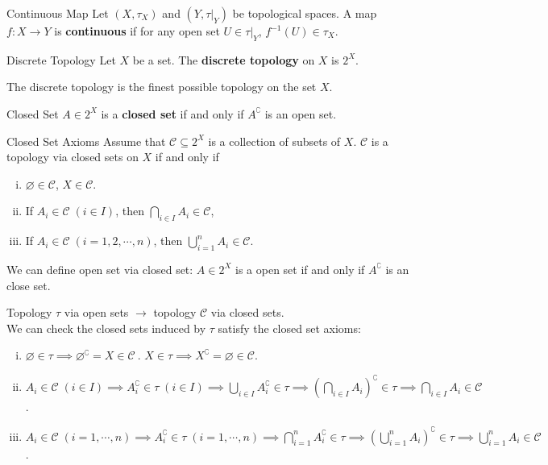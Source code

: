 \documentclass{report}
\begin{document}
\begin{definition}{Continuous Map}{}
	Let $(X,\tau_X)$ and $(Y,\tau |_Y)$ be topological spaces. A map $f:X\to Y$ is \textbf{continuous} if for any open set $U\in\tau |_Y$, $f^{-1}(U)\in\tau_X$.
\end{definition}

\begin{definition}{Discrete Topology}{}
	Let $X$ be a set. The \textbf{discrete topology} on $X$ is $2^X$.
\end{definition}

The discrete topology is the finest possible topology on the set $X$.

\begin{definition}{Closed Set}{}
	$A\in 2^X$ is a \textbf{closed set} if and only if $A^{\complement}$ is an open set.
\end{definition}

\begin{definition}{Closed Set Axioms}{}
	Assume that $\mathcal{C}\subseteq2^X $ is a collection of subsets of $X$. $\mathcal{C}$ is a topology via closed sets on $X$ if and only if
	\begin{enumerate}[(i)]
		\item $\varnothing\in \mathcal{C}$, $X\in \mathcal{C}$.
		\item If $A_i\in\mathcal{C}\;(i\in I)$, then $\bigcap\limits_{i\in I}A_i\in \mathcal{C}$,
		\item If $A_i\in\mathcal{C}\;(i=1,2,\cdots,n)$, then $\bigcup\limits_{i=1}^nA_i\in \mathcal{C}$.
	\end{enumerate}
	We can define open set via closed set: $A\in 2^X$ is a open set if and only if $A^{\complement}$ is an close set.
\end{definition}


\begin{prf}
	Topology $\tau$ via open sets $\rightarrow$ topology $\mathcal{C}$ via closed sets.\\
	We can check the closed sets induced by $\tau$ satisfy the closed set axioms:
	\begin{enumerate}[(i)]
		\item $\varnothing\in \tau\implies\varnothing^{\complement}=X\in \mathcal{C} \ $. $X\in \tau\implies X^{\complement}=\varnothing\in \mathcal{C}$.
		\item $A_i\in\mathcal{C}\;(i\in I)\implies A_i^{\complement}\in\tau\;(i\in I)\implies\bigcup\limits_{i\in I}A_i^{\complement}\in \tau\implies \left(\bigcap\limits_{i\in I}A_i\right)^{\complement}\in \tau\implies\bigcap\limits_{i\in I}A_i\in\mathcal{C}$.
		\item $A_i\in\mathcal{C}\;(i=1,\cdots,n)\implies A_i^{\complement}\in\tau\;(i=1,\cdots,n)\implies\bigcap\limits_{i=1}^nA_i^{\complement}\in \tau\implies \left(\bigcup\limits_{i=1}^nA_i\right)^{\complement}\in \tau\implies\bigcup\limits_{i=1}^nA_i\in\mathcal{C}$.
	\end{enumerate}
\end{prf}
\end{document}
